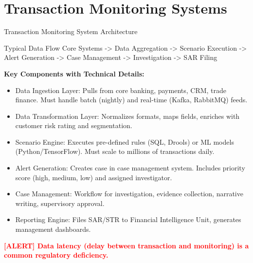 \documentclass[11pt,a4paper]{beamer}
\newcommand{\redflag}[1]{\textcolor{red}{\textbf{[ALERT] #1}}}
\begin{document}
	\section{Transaction Monitoring Systems}
	
	\begin{frame}{Transaction Monitoring System Architecture}
		\begin{block}{Typical Data Flow}
			Core Systems -> Data Aggregation -> Scenario Execution -> Alert Generation -> Case Management -> Investigation -> SAR Filing
		\end{block}
		
		\textbf{Key Components with Technical Details:}
		\begin{itemize}
			\item Data Ingestion Layer: Pulls from core banking, payments, CRM, trade finance. Must handle batch (nightly) and real-time (Kafka, RabbitMQ) feeds.
			\item Data Transformation Layer: Normalizes formats, maps fields, enriches with customer risk rating and segmentation.
			\item Scenario Engine: Executes pre-defined rules (SQL, Drools) or ML models (Python/TensorFlow). Must scale to millions of transactions daily.
			\item Alert Generation: Creates case in case management system. Includes priority score (high, medium, low) and assigned investigator.
			\item Case Management: Workflow for investigation, evidence collection, narrative writing, supervisory approval.
			\item Reporting Engine: Files SAR/STR to Financial Intelligence Unit, generates management dashboards.
		\end{itemize}
		
		\redflag{Data latency (delay between transaction and monitoring) is a common regulatory deficiency.}
	\end{frame}
	
\end{document}
